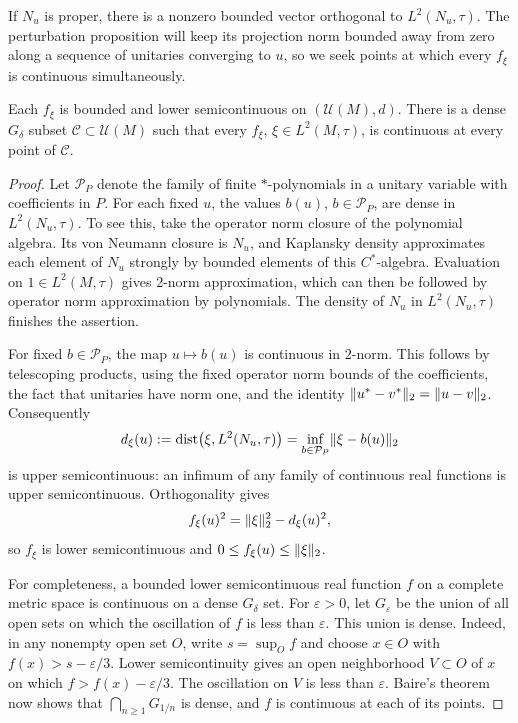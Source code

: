 If $N_u$ is proper, there is a nonzero bounded vector orthogonal to
$L^2(N_u,\tau)$. The perturbation proposition will keep its projection
norm bounded away from zero along a sequence of unitaries converging to
$u$, so we seek points at which every $f_\xi$ is continuous simultaneously.

\begin{lemma}
\label{lem:projection-continuity}
Each $f_\xi$ is bounded and lower semicontinuous on
$(\mathcal U(M),d)$. There is a dense $G_\delta$ subset
$\mathcal C\subset\mathcal U(M)$ such that every $f_\xi$,
$\xi\in L^2(M,\tau)$, is continuous at every point of $\mathcal C$.
\end{lemma}

\begin{proof}
Let $\mathcal P_P$ denote the family of finite $*$-polynomials in a
unitary variable with coefficients in $P$. For each fixed $u$, the
values $b(u)$, $b\in\mathcal P_P$, are dense in $L^2(N_u,\tau)$.
To see this, take the operator norm closure of the polynomial algebra.
Its von Neumann closure is $N_u$, and Kaplansky density approximates
each element of $N_u$ strongly by bounded elements of this
$C^*$-algebra. Evaluation on $1\in L^2(M,\tau)$ gives $2$-norm
approximation, which can then be followed by operator norm
approximation by polynomials. The density of $N_u$ in $L^2(N_u,\tau)$
finishes the assertion.

For fixed $b\in\mathcal P_P$, the map $u\mapsto b(u)$ is continuous
in $2$-norm. This follows by telescoping products, using the fixed
operator norm bounds of the coefficients, the fact that unitaries
have norm one, and the identity
$\lVert u^*-v^*\rVert_2=\lVert u-v\rVert_2$. Consequently
\[
 d_\xi(u):=\operatorname{dist}\bigl(\xi,L^2(N_u,\tau)\bigr)
 =\inf_{b\in\mathcal P_P}\lVert \xi-b(u)\rVert_2
\]
is upper semicontinuous: an infimum of any family of continuous
real functions is upper semicontinuous. Orthogonality gives
\[
 f_\xi(u)^2=\lVert \xi\rVert_2^2-d_\xi(u)^2,
\]
so $f_\xi$ is lower semicontinuous and
$0\leq f_\xi(u)\leq\lVert \xi\rVert_2$.

For completeness, a bounded lower semicontinuous real function $f$
on a complete metric space is continuous on a dense $G_\delta$ set.
For $\varepsilon>0$, let $G_\varepsilon$ be the union of all open
sets on which the oscillation of $f$ is less than $\varepsilon$.
This union is dense. Indeed, in any nonempty open set $O$, write
$s=\sup_O f$ and choose $x\in O$ with
$f(x)>s-\varepsilon/3$. Lower semicontinuity gives an open
neighborhood $V\subset O$ of $x$ on which
$f>f(x)-\varepsilon/3$. The oscillation on $V$ is less than
$\varepsilon$. Baire's theorem now shows that
$\bigcap_{n\geq1}G_{1/n}$ is dense, and $f$ is continuous at each
of its points.


\end{proof}
